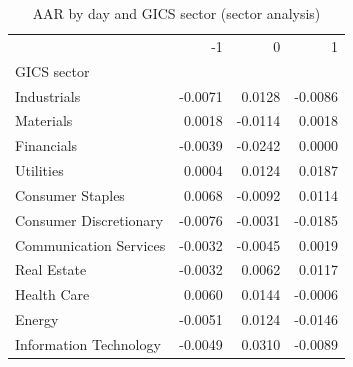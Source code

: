 \begin{table}
\caption{AAR by day and GICS sector (sector analysis)}
\label{tab:sector_aar}
\begin{tabular}{lrrr}
\toprule
 & -1 & 0 & 1 \\
GICS sector &  &  &  \\
\midrule
Industrials & -0.0071 & 0.0128 & -0.0086 \\
Materials & 0.0018 & -0.0114 & 0.0018 \\
Financials & -0.0039 & -0.0242 & 0.0000 \\
Utilities & 0.0004 & 0.0124 & 0.0187 \\
Consumer Staples & 0.0068 & -0.0092 & 0.0114 \\
Consumer Discretionary & -0.0076 & -0.0031 & -0.0185 \\
Communication Services & -0.0032 & -0.0045 & 0.0019 \\
Real Estate & -0.0032 & 0.0062 & 0.0117 \\
Health Care & 0.0060 & 0.0144 & -0.0006 \\
Energy & -0.0051 & 0.0124 & -0.0146 \\
Information Technology & -0.0049 & 0.0310 & -0.0089 \\
\bottomrule
\end{tabular}
\end{table}
